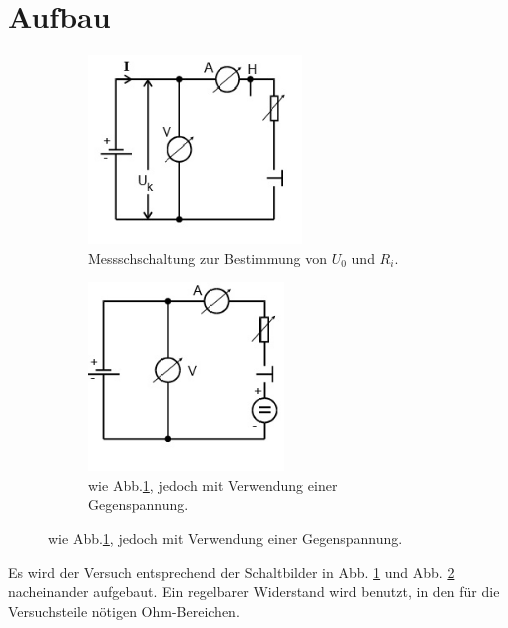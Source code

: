 \section{Aufbau}
\label{sec:Aufbau}
\begin{figure}
    \centering
    \begin{subfigure}{0.48\textwidth}
      \centering
      \includegraphics[height=5cm]{data/abb2.jpg}
      \caption{Messschschaltung zur Bestimmung von $U_0$ und $R_i$. \cite{V301}}
      \label{fig:abb2}
    \end{subfigure}
    \begin{subfigure}{0.48\textwidth}
      \centering
      \includegraphics[height=5cm]{data/abb3.jpg}
      \caption{wie Abb.\ref{fig:abb2}, jedoch mit Verwendung einer Gegenspannung. \cite{V301}}
      \label{fig:abb3}
    \end{subfigure}
    \label{fig:Phasen}
\end{figure}
Es wird der Versuch entsprechend der Schaltbilder in Abb. \ref{fig:abb2} und Abb. \ref{fig:abb3} nacheinander aufgebaut.
Ein regelbarer Widerstand wird benutzt, in den für die Versuchsteile nötigen Ohm-Bereichen.